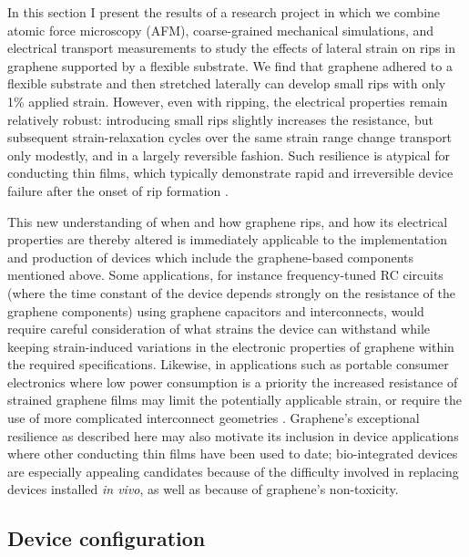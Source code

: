 \documentclass[edeposit,fullpage,draftthesis]{uiucthesis2009}
\begin{document}
        In this section I present the results of a research project in which 
        we combine atomic force microscopy (AFM), coarse-grained
        mechanical simulations, and electrical transport measurements to study the
        effects of lateral strain on rips in graphene supported by a flexible substrate. 
        We find that graphene adhered to
        a flexible substrate and then stretched laterally can develop small rips with
        only 1\% applied strain. However, even with ripping, the electrical properties
        remain relatively robust: introducing small rips slightly increases the
        resistance, but subsequent strain-relaxation cycles over the same strain range
        change transport only modestly, and in a largely reversible fashion. Such
        resilience is atypical for conducting thin films, which typically demonstrate
        rapid and irreversible device failure after the onset of rip
        formation \cite{Cairns2000,Fortunato2002}.
    
        This new understanding of when and how graphene rips, and how its electrical
        properties are thereby altered is immediately applicable to the implementation
        and production of devices which include the graphene-based components mentioned
        above. Some applications, for instance frequency-tuned RC circuits (where the 
        time constant of the device depends strongly on the resistance of the graphene components) using
        graphene capacitors and interconnects, would require careful consideration of
        what strains the device can withstand while keeping strain-induced variations
        in the electronic properties of graphene within the required specifications.
        Likewise, in applications such as portable consumer electronics where low power
        consumption is a priority the increased resistance of strained graphene films
        may limit the potentially applicable strain, or require the use of more
        complicated interconnect geometries \cite{Kim2011}. Graphene's exceptional
        resilience as described here may also motivate its inclusion in device
        applications where other conducting thin films have been used to date;
        bio-integrated devices \cite{viventi2010conformal} are especially appealing candidates
        because of the difficulty involved in replacing devices installed \textit{in
        vivo}, as well as because of graphene's non-toxicity.
       
    \subsection{Device configuration}
    
\end{document}
